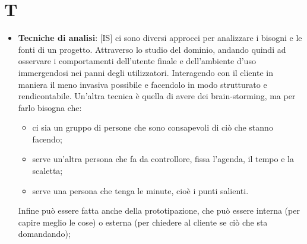 %
%
%

\section{T} %
\label{sec:t}
	\begin{itemize}
		\item \textbf{Tecniche di analisi}: [IS] ci sono diversi approcci per analizzare i bisogni e le fonti di un progetto. Attraverso lo studio del dominio, andando quindi ad osservare i comportamenti dell'utente finale e dell'ambiente d'uso immergendosi nei panni degli utilizzatori. Interagendo con il cliente in maniera il meno invasiva possibile e facendolo in modo strutturato e rendicontabile. Un'altra tecnica è quella di avere dei brain-storming, ma per farlo bisogna che:
			\begin{itemize}
				\item ci sia un gruppo di persone che sono consapevoli di ciò che stanno facendo;
				\item serve un'altra persona che fa da controllore, fissa l'agenda, il tempo e la scaletta;
				\item serve una persona che tenga le minute, cioè i punti salienti.
			\end{itemize}
		\noindent
		Infine può essere fatta anche della prototipazione, che può essere interna (per capire meglio le cose) o esterna (per chiedere al cliente se ciò che sta domandando);

	\end{itemize}
